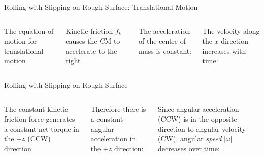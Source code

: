 \documentclass[12pt,compress,aspectratio=169]{beamer}
\begin{document}
\begin{frame}{Rolling with Slipping on Rough Surface: Translational Motion}
  \begin{columns}[T]
    

    The equation of motion for translational motion


    \vspace{-.02in}Kinetic friction $f_k$ causes the CM to accelerate to the
    right


    \vspace{-.15in}The acceleration of the centre of mass is constant:


    \vspace{-.15in}The velocity along the $x$ direction increases with time:

  \end{columns}
\end{frame}



\begin{frame}{Rolling with Slipping on Rough Surface}
  \begin{columns}[T]
    

    The constant kinetic friction force generates a constant net torque in the
    $+z$ (CCW) direction
    

    \vspace{-.2in}Therefore there is a constant angular acceleration in the
    $+z$ direction:


    \vspace{-.05in}Since angular acceleration (CCW) is in the opposite
    direction to angular velocity (CW), angular \emph{speed} $|\omega|$
    decreases over time:

  \end{columns}
\end{frame}
\end{document}
